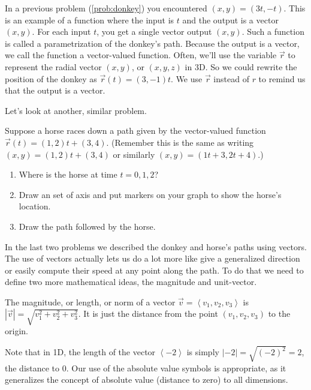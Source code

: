 \vskip0.2in

In a previous problem (\ref{prob:donkey}) you encountered $(x,y)=(3t,-t)$.  This is an example of a function where the input is $t$ and the output is a vector $(x,y)$.  For each input $t$, you get a single vector output $(x,y)$. Such a function is called a parametrization of the donkey's path. Because the output is a vector, we call the function a vector-valued function. Often, we'll use the variable $\vec r$ to represent the radial vector $(x,y)$, or $(x,y,z)$ in 3D.  So we could rewrite the position of the donkey as $\vec r(t)=(3,-1)t$. We use $\vec r$ instead of $r$ to remind us that the output is a vector.

Let's look at another, similar problem.

\begin{problem}\label{prob:horseline}
Suppose a horse races down a path given by the vector-valued function $\vec r(t) = (1,2)t+(3,4)$. (Remember this is the same as writing $(x,y) =  (1,2)t+(3,4)$ or similarly  $(x,y)=(1t+3,2t+4)$.)
\begin{enumerate}
	\item Where is the horse at time $t=0,1,2$? 
	\item Draw an set of axis and put markers on your graph to show the horse's location.
	\item Draw the path followed by the horse.
\end{enumerate}

\end{problem}



In the last two problems we described the donkey and horse's paths using vectors. The use of vectors actually lets us do a lot more like give a generalized direction or easily compute their speed at any point along the path. To do that we need to define two more mathematical ideas, the magnitude and unit-vector.

\begin{definition}
The magnitude, or length, or norm of a vector $\vec v = \left<v_1,v_2,v_3\right>$ is $|\vec v| = \sqrt{v_1^2+v_2^2+v_3^2}$. It is just the distance from the point $(v_1,v_2,v_3)$ to the origin.

Note that in 1D, the length of the vector $\left<-2\right>$ is simply $|-2|=\sqrt{(-2)^2}=2$, the distance to 0. Our use of the absolute value symbols is appropriate, as it generalizes the concept of absolute value (distance to zero) to all dimensions.

\end{definition}

